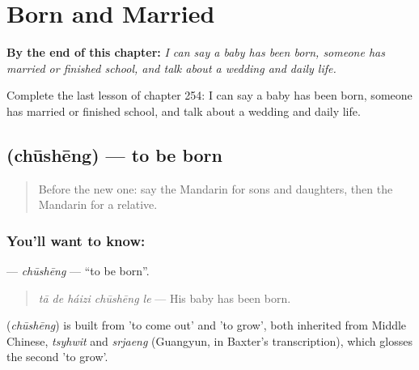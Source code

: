 
\chapter{Born and Married}
\label{ch:zh-born-and-married}

\begin{chapteropening}
\textbf{By the end of this chapter:} \emph{I can say a baby has been born, someone has married or finished school, and talk about a wedding and daily life.}

Complete the last lesson of chapter 254: I can say a baby has been born, someone has married or finished school, and talk about a wedding and daily life.
\end{chapteropening}

\section[\texorpdfstring{\zh{出生} (chūshēng)}{出生 (chūshēng)}]{ (chūshēng) — to be born}

\label{lesson:ZH-C254-chusheng}



\begin{quote}
Before the new one: say the Mandarin for sons and daughters, then the Mandarin for a relative.
\end{quote}

\subsection*{You'll want to know: }
\textbf{} — \emph{chūshēng} — \textquotedblleft{}to be born\textquotedblright{}.

\begin{quote}
\textbf{} \emph{tā de háizi chūshēng le} — His baby has been born.
\end{quote}

\begin{cousinweb}
\textbf{} (\emph{chūshēng}) is built from  'to come out' and  'to grow', both inherited from Middle Chinese, \emph{tsyhwit} and \emph{srjaeng} (Guangyun, in Baxter's transcription), which glosses the second 'to grow'.
\end{cousinweb}

